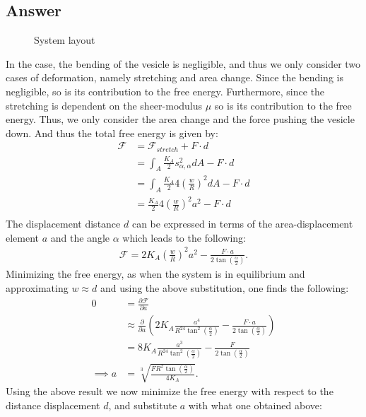 \documentclass[a4paper]{article}
\newcommand{\F}{\mathcal{F}}
\begin{document}
\subsection*{Answer}
\begin{figure}[H]
    \centering
    \caption*{System layout}
\end{figure}\noindent
In the case, the bending of the vesicle is negligible, and thus we only consider two cases of deformation, namely stretching and area change. Since the bending is negligible, so is its contribution to the free energy.
Furthermore, since the stretching is dependent on the sheer-modulus $\mu$ so is its contribution to the free energy. Thus, we only consider the area change and the force pushing the vesicle down. And thus the total free energy is given by:
\begin{align*}
    \F &= \F_{stretch} + F\cdot d\\
    &= \int_A \frac{K_A}{2}s^{2}_{\alpha, \alpha}dA - F\cdot d\\
    &= \int_A \frac{K_A}{2}4\left(\frac{w}{R}\right)^2dA - F\cdot d\\
    &= \frac{K_A}{2}4\left(\frac{w}{R}\right)^2a^2- F\cdot d\\
\end{align*}
The displacement distance $d$ can be expressed in terms of the area-displacement element $a$ and the angle $\alpha$ which leads to the following:
\begin{align*}
    \F = 2K_A \left(\frac{w}{R}\right)^2a^2 - \frac{F\cdot a}{2\tan{\left(\frac{\alpha}{2}\right)}}.
\end{align*}Minimizing the free energy, as when the system is in equilibrium and approximating $w \approx d$ and using the above substitution, one finds the following:
\begin{align*}
    0 &=\frac{\partial \F}{\partial a}\\
    &\approx \frac{\partial}{\partial a}\left(2K_A\frac{a^4}{R^24\tan^2{\left(\frac{\alpha}{2}\right)}} - \frac{F\cdot a}{2\tan{\left(\frac{\alpha}{2}\right)}}\right)\\
    &= 8K_A\frac{a^3}{R^24\tan^2{\left(\frac{\alpha}{2}\right)}} - \frac{F}{2\tan{\left(\frac{\alpha}{2}\right)}}\\
    \implies a &= \sqrt[3]{\frac{FR^2\tan{\left(\frac{\alpha}{2}\right)}}{4K_A}}.
\end{align*}Using the above result we now minimize the free energy with respect to the distance displacement $d$, and substitute $a$ with what one obtained above:
\end{document}
